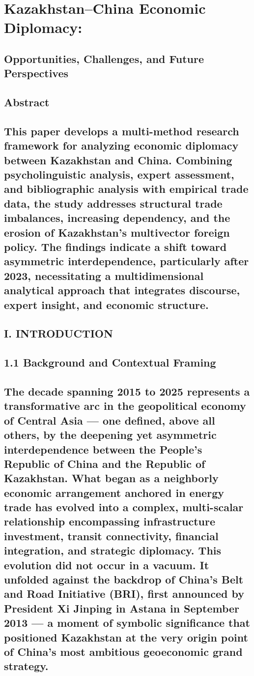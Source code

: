 \documentclass[12pt]{article}
\begin{document}
\section{Kazakhstan--China Economic Diplomacy:}
\subsection{Opportunities, Challenges, and Future Perspectives}
\subsection{Abstract}
\subsection{This paper develops a multi-method research framework for analyzing economic diplomacy between Kazakhstan and China. Combining psycholinguistic analysis, expert assessment, and bibliographic analysis with empirical trade data, the study addresses structural trade imbalances, increasing dependency, and the erosion of Kazakhstan’s multivector foreign policy. The findings indicate a shift toward asymmetric interdependence, particularly after 2023, necessitating a multidimensional analytical approach that integrates discourse, expert insight, and economic structure.}


\subsection{I. INTRODUCTION}
\subsection{1.1 Background and Contextual Framing}
\subsection{The decade spanning 2015 to 2025 represents a transformative arc in the geopolitical economy of Central Asia --- one defined, above all others, by the deepening yet asymmetric interdependence between the People's Republic of China and the Republic of Kazakhstan. What began as a neighborly economic arrangement anchored in energy trade has evolved into a complex, multi-scalar relationship encompassing infrastructure investment, transit connectivity, financial integration, and strategic diplomacy. This evolution did not occur in a vacuum. It unfolded against the backdrop of China's Belt and Road Initiative (BRI), first announced by President Xi Jinping in Astana in September 2013 --- a moment of symbolic significance that positioned Kazakhstan at the very origin point of China's most ambitious geoeconomic grand strategy.}
\end{document}
